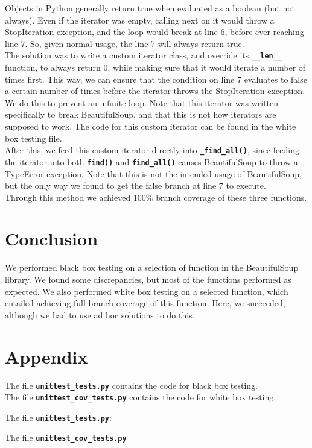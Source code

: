 \documentclass[10pt]{article}
\newcommand{\tbt}[1]{\texttt{\textbf{#1}}}
\begin{document}
Objects in Python generally return true when evaluated as a boolean (but not always). Even if the iterator was empty, calling next on it would throw a StopIteration exception, and the loop would break at line 6, before ever reaching line 7. So, given normal usage, the line 7 will always return true. \\

The solution was to write a custom iterator class, and override its \tbt{\_\_len\_\_} function, to always return 0, while making sure that it would iterate a number of times first. This way, we can ensure that the condition on line 7 evaluates to false a certain number of times before the iterator throws the StopIteration exception. We do this to prevent an infinite loop. Note that this iterator was written specifically to break BeautifulSoup, and that this is not how iterators are supposed to work. The code for this custom iterator can be found in the white box testing file. \\

After this, we feed this custom iterator directly into \tbt{\_find\_all()}, since feeding the iterator into both \tbt{find()} and \tbt{find\_all()} causes BeautifulSoup to throw a TypeError exception. Note that this is not the intended usage of BeautifulSoup, but the only way we found to get the false branch at line 7 to execute. \\

Through this method we achieved 100\% branch coverage of these three functions. 

\section{Conclusion}

We performed black box testing on a selection of function in the BeautifulSoup library. We found some discrepancies, but most of the functions performed as expected. We also performed white box testing on a selected function, which entailed achieving full branch coverage of this function. Here, we succeeded, although we had to use ad hoc solutions to do this.

\section{Appendix}

The file \tbt{unittest\_tests.py} contains the code for black box testing. \\
The file \tbt{unittest\_cov\_tests.py} contains the code for white box testing. \\
\vspace{1em}

\begin{adjustwidth}{-6.5em}{0em}
The file \tbt{unittest\_tests.py}:
 
\vspace{1em}

The file \tbt{unittest\_cov\_tests.py}

\end{adjustwidth}
\end{document}
